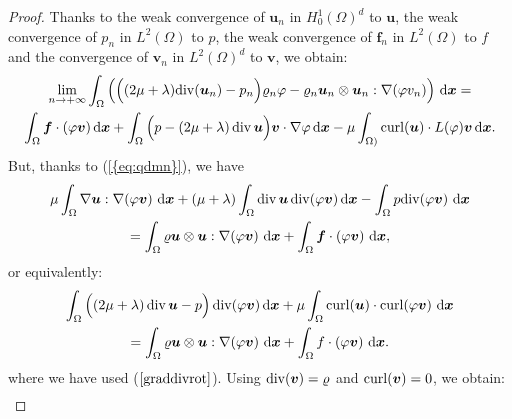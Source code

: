 \documentclass{amsart}
\numberwithin{equation}{section}
\begin{document}
\begin{proof}
Thanks to the weak  convergence of ${{\boldsymbol u}}_n$ in $H^1_0(\Omega)^d$ to ${{\boldsymbol u}}$, the weak convergence of $p_n$ in $L^2(\Omega)$ to $p$,
the weak convergence of $\bm{f}_n$ in $L^2(\Omega)$ to $f$  and the
convergence of ${\bm{v}}_n$  in $L^2(\Omega)^d$ to ${\bm{v}}$, we obtain:
\begin{multline}
\lim_{{n {\rightarrow} + \infty}} \int_{\Omega}  \Big(\Big((2\mu+\lambda){{\rm div}}({{\boldsymbol u}}_n) - p_n\Big) {\varrho}_n \varphi - {\varrho}_n {{\boldsymbol u}}_n \otimes {{\boldsymbol u}}_n :  {{\nabla}} (\varphi v_n) \Big)\, {\, {\rm d}{{\boldsymbol x}}}= \\ \int _{\Omega} \bm{f} \cdot (\varphi {\bm{v}}) {\, {\rm d}{{\boldsymbol x}}} + \int_{\Omega} \Big(p-(2\mu+\lambda)\operatorname{div} {\bm{u}}\Big) {\bm{v}} \cdot {{\nabla}} \varphi{\, {\rm d}{{\boldsymbol x}}} - \mu  \int _{\Omega)}{{\rm curl}}({{\boldsymbol u}}) \cdot  L(\varphi){\bm{v}} {\, {\rm d}{{\boldsymbol x}}}. 
\label{cpc}
\end{multline}
But, thanks to {(\ref{{eq:qdmn}})}, we have
\begin{multline*}
\mu \int_{\Omega} {{\nabla}} {{\boldsymbol u}} : {{\nabla}} (\varphi {\bm{v}} )\,{\, {\rm d}{{\boldsymbol x}}} +(\mu+\lambda) \int_\Omega \operatorname{div} {{\boldsymbol u}} \operatorname{div} (\varphi {\bm{v}}) {\, {\rm d}{{\boldsymbol x}}}  - \int_{\Omega} p {{\rm div}} (\varphi {\bm{v}} )\, {\, {\rm d}{{\boldsymbol x}}} \\ =  \int_{\Omega} {\varrho}  {{\boldsymbol u}}  \otimes {{\boldsymbol u}}  : {{\nabla}} ( \varphi {\bm{v}} )\, {\, {\rm d}{{\boldsymbol x}}} + \int _{\Omega} \bm{f} \cdot(\varphi {\bm{v}} )\,{\, {\rm d}{{\boldsymbol x}}},
\end{multline*}
or equivalently:
\begin{multline*}
\int_{\Omega} \Big((2\mu+\lambda) \operatorname{div} {\bm{u}} -p \Big) \operatorname{div} (\varphi {\bm{v}}) {\, {\rm d}{{\boldsymbol x}}}  +\mu \int_{\Omega} {{\rm curl}} ({{\boldsymbol u}}) \cdot {{\rm curl}}(\varphi {\bm{v}} )\,{\, {\rm d}{{\boldsymbol x}}} \\ =  \int_\Omega {\varrho}  {{\boldsymbol u}}  \otimes {{\boldsymbol u}}  : {{\nabla}} (\varphi {\bm{v}}  )\, {\, {\rm d}{{\boldsymbol x}}}+ \int _{\Omega} f \cdot (\varphi {\bm{v}} ) \,{\, {\rm d}{{\boldsymbol x}}}.
\end{multline*}
where we have used ($\ref{graddivrot}$).
Using ${{\rm div}}({\bm{v}})={\varrho}$ and  ${{\rm curl}}({\bm{v}})=0$, we obtain:
\begin{multline*}

\end{multline*}
\end{proof}
\end{document}
